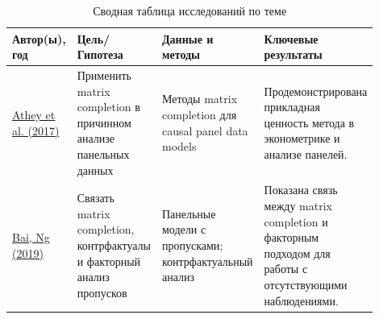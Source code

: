 \documentclass[a4paper,12pt]{article}
\begin{document}
\begin{table}[H]
    \centering
    \caption{Сводная таблица исследований по теме}
    \label{tab:literature}
    \begin{tabular}{p{0.15\linewidth}p{0.25\linewidth}p{0.2\linewidth}p{0.3\linewidth}}
        \toprule
        \textbf{Автор(ы), год}                                       & \textbf{Цель/Гипотеза}                                                & \textbf{Данные и методы}                                         & \textbf{Ключевые результаты}                                                                          \\
        \midrule
        \href{https://arxiv.org/abs/1710.10251}{Athey et al. (2017)} & Применить matrix completion в причинном анализе панельных данных      & Методы matrix completion для causal panel data models            & Продемонстрирована прикладная ценность метода в эконометрике и анализе панелей.                       \\
        \href{https://arxiv.org/abs/1910.06677}{Bai, Ng (2019)}      & Связать matrix completion, контрфактуалы и факторный анализ пропусков & Панельные модели с пропусками; контрфактуальный анализ & Показана связь между matrix completion и факторным подходом для работы с отсутствующими наблюдениями. \\
        \bottomrule
    \end{tabular}
\end{table}
\end{document}
